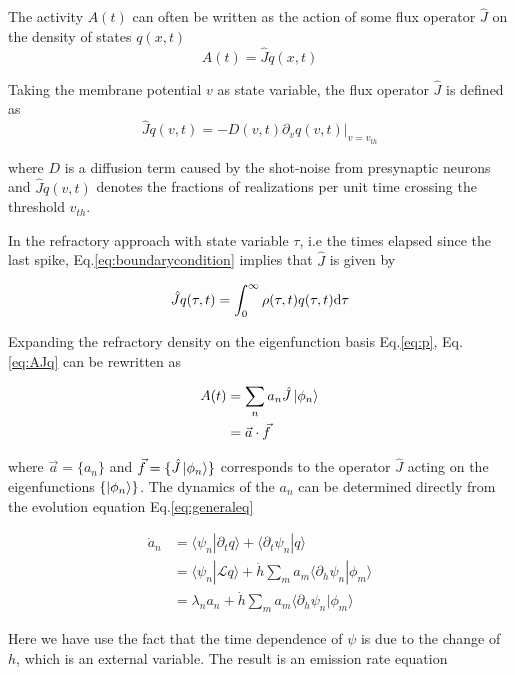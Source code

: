 \documentclass[12pt,twoside]{report}
\def \dd  {{\rm d}}
\begin{document}
The activity $A(t)$ can often be written as the action of some flux operator $\hat{J}$ on the density of states $q(x,t)$
\begin{equation}
\label{eq:AJq}
A(t)=\hat{J}q(x,t)
\end{equation}


Taking the membrane potential $v$ as state variable, the flux operator $\hat{J}$ is defined as
\begin{equation}
\hat{J}q(v,t)=-D(v,t)\partial_v q(v,t)|_{v=v_{th}}
\end{equation}

where $D$ is a diffusion term caused by the shot-noise from presynaptic neurons and $\hat{J}q(v,t)$ denotes the fractions of realizations per unit time crossing the threshold $v_{th}$.

In the refractory approach with state variable $\tau$, i.e the times elapsed since the last spike, Eq.\eqref{eq:boundarycondition} implies that $\hat{J}$ is given by

\begin{equation}
\hat{J}q(\tau,t)=\int_0^\infty \rho(\tau,t)q(\tau,t)\dd \tau
\end{equation}

Expanding the refractory density on the eigenfunction basis Eq.\eqref{eq:p},  Eq.\eqref{eq:AJq} can be rewritten as

\begin{align}
\label{eq:AJphi}
A(t)&=\sum_n a_n\hat{J}\ket{\phi_n} \nonumber \\
&=\vec{a}\cdot\vec{f}
\end{align}

where $\vec{a}=\{a_n\}$ and $\vec{f}=\{\hat{J}\ket{\phi_n}\}$ corresponds to the operator $\hat{J}$ acting on the eigenfunctions $\{\ket{\phi_n}\}$.
The dynamics of the $a_n$ can be determined directly from the evolution equation Eq.\eqref{eq:generaleq}

\begin{align}
\label{eq:andyn}
\dot{a}_n&=\langle\psi_n|\partial_t q\rangle+\langle\partial_t\psi_n|q\rangle \nonumber \\
&=\langle\psi_n|\mathcal{L}q\rangle+  \dot{h}\sum_ma_m\langle\partial_h\psi_n|\phi_m \rangle \nonumber \\
&=\lambda_n a_n +  \dot{h}\sum_ma_m\langle\partial_h\psi_n|\phi_m \rangle 
\end{align}


Here we have use the fact that the time dependence of $\psi$ is due to the change of $h$, which is an external variable. The result is an emission rate equation
\end{document}
